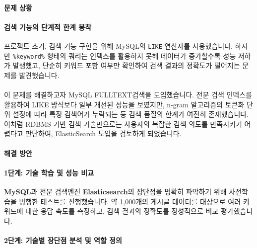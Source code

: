 \documentclass[12pt,a4paper]{article}
\begin{document}

    \paragraph{문제 상황}

    \paragraph{검색 기능의 단계적 한계 봉착} \par
    프로젝트 초기, 검색 기능 구현을 위해 MySQL의 \texttt{LIKE} 연산자를 사용했습니다. 하지만 \texttt{\%keyword\%} 형태의 쿼리는 인덱스를 활용하지 못해 데이터가 증가할수록 성능 저하가 발생했고, 단순히 키워드 포함 여부만 확인하여 검색 결과의 정확도가 떨어지는 문제를 발견했습니다.
    \paragraph{}
    이 문제를 해결하고자 MySQL FULLTEXT검색을 도입했습니다. 전문 검색 인덱스를 활용하여 LIKE 방식보다 일부 개선된 성능을 보였지만, n-gram 알고리즘의 토큰화 단위 설정에 따라 특정 검색어가 누락되는 등 검색 품질의 한계가 여전히 존재했습니다. 이처럼 RDBMS 기반 검색 기술만으로는 사용자의 복잡한 검색 의도를 만족시키기 어렵다고 판단하여, ElasticSearch 도입을 검토하게 되었습니다.\\


    \paragraph{해결 방안}

    \paragraph{1단계: 기술 학습 및 성능 비교} \par
    \textbf{MySQL}과 전문 검색엔진 \textbf{Elasticsearch}의 장단점을 명확히 파악하기 위해 사전학습을 병행한 테스트를 진행했습니다. 약 1,000개의 게시글 데이터를 대상으로 여러 키워드에 대한 응답 속도를 측정하고, 검색 결과의 정확도를 정성적으로 비교 평가했습니다.

    \vspace{1em}
    \paragraph{2단계: 기술별 장단점 분석 및 역할 정의} \par
\end{document}
